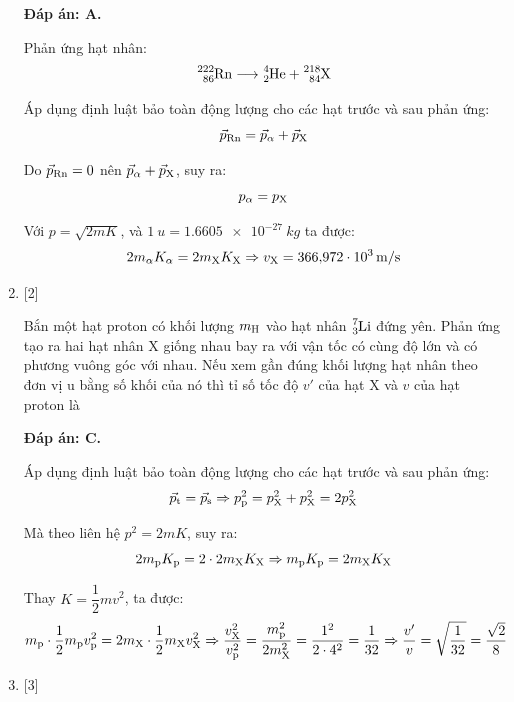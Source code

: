 \begin{enumerate}[label=\bfseries Câu \arabic*:]
	\loigiai
	{		\textbf{Đáp án: A.}
		
		Phản ứng hạt nhân:
	$$\ce{^222_86 Rn} \longrightarrow \ce{^4_2 He} + \ce{^218_84 X}$$
	
	Áp dụng định luật bảo toàn động lượng cho các hạt trước và sau phản ứng:
	$$\vec p_{\ce{Rn}} = \vec p_{\ce{\alpha}} + \vec p_{\ce{X}}$$
	
	Do $\vec p_{\ce{Rn}} = 0$ nên $\vec p_{\ce{\alpha}} + \vec p_{\ce{X}}$, suy ra:
	$$p_{\ce{\alpha}} = p_{\ce{X}}$$
	
	Với $p=\sqrt{2mK}$, và $\SI{1}{u} = \SI{1.6605e-27}{kg}$ ta được:
	$$2 m_{\ce{\alpha}} K_{\ce{\alpha}} = 2 m_{\ce{X}} K_{\ce{X}} \Rightarrow v_{\ce{X}} = \SI{366.972e3}{m/s}$$
	}
	\item {} [2]
	
	\cauhoi
	{Bắn một hạt proton có khối lượng $m_{\ce{H}}$ vào hạt nhân $\ce{^7_3 Li}$ đứng yên. Phản ứng tạo ra hai hạt nhân X giống nhau bay ra với vận tốc có cùng độ lớn và có phương vuông góc với nhau. Nếu xem gần đúng khối lượng hạt nhân theo đơn vị u bằng số khối của nó thì tỉ số tốc độ $v'$ của hạt X và $v$ của hạt proton là
	}
	
	\loigiai
	{		\textbf{Đáp án: C.}
		
		Áp dụng định luật bảo toàn động lượng cho các hạt trước và sau phản ứng:
$$\vec p_{\text t} = \vec p_{\text s} \Rightarrow p_{\ce{p}}^2 = p_{\ce{X}}^2 + p_{\ce{X}}^2 = 2p_{\ce{X}}^2$$

Mà theo liên hệ $p^2=2mK$, suy ra:
$$2 m_{\ce{p}} K_{\ce{p}} = 2 \cdot 2 m_{\ce{X}} K_{\ce{X}} \Rightarrow m_{\ce{p}} K_{\ce{p}} = 2 m_{\ce{X}} K_{\ce{X}}$$

Thay $K=\dfrac{1}{2} mv^2$, ta được:
$$m_{\ce{p}} \cdot \dfrac{1}{2} m_{\ce{p}} v_{\ce{p}}^2 = 2 m_{\ce{X}} \cdot \dfrac{1}{2} m_{\ce{X}} v_{\ce{X}}^2 \Rightarrow \dfrac{v_{\ce{X}}^2}{v_{\ce{p}}^2} = \dfrac{m_{\ce{p}}^2}{2 m_{\ce{X}}^2} = \dfrac{1^2}{2 \cdot 4^2} = \dfrac{1}{32} \Rightarrow \dfrac{v'}{v} = \sqrt{\dfrac{1}{32}} = \dfrac{\sqrt 2}{8}$$
		
	}
	
	\item {} [3]
	

\end{enumerate}
